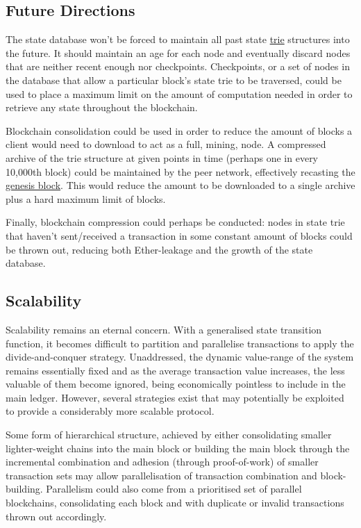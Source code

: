 \documentclass[9pt,oneside]{amsart}
\begin{document}
\begin{multicols}{2}
\section{Future Directions} \label{ch:future}

The state database won't be forced to maintain all past state \hyperlink{trie}{trie} structures into the future. It should maintain an age for each node and eventually discard nodes that are neither recent enough nor checkpoints. Checkpoints, or a set of nodes in the database that allow a particular block's state trie to be traversed, could be used to place a maximum limit on the amount of computation needed in order to retrieve any state throughout the blockchain.

Blockchain consolidation could be used in order to reduce the amount of blocks a client would need to download to act as a full, mining, node. A compressed archive of the trie structure at given points in time (perhaps one in every 10,000th block) could be maintained by the peer network, effectively recasting the \hyperlink{Genesis_Block}{genesis block}. This would reduce the amount to be downloaded to a single archive plus a hard maximum limit  of blocks.

Finally, blockchain compression could perhaps be conducted: nodes in state trie that haven't sent/received a transaction in some constant amount of blocks could be thrown out, reducing both Ether-leakage and the growth of the state database.

\subsection{Scalability}

Scalability remains an eternal concern. With a generalised state transition function, it becomes difficult to partition and parallelise transactions to apply the divide-and-conquer strategy. Unaddressed, the dynamic value-range of the system remains essentially fixed and as the average transaction value increases, the less valuable of them become ignored, being economically pointless to include in the main ledger. However, several strategies exist that may potentially be exploited to provide a considerably more scalable protocol.

Some form of hierarchical structure, achieved by either consolidating smaller lighter-weight chains into the main block or building the main block through the incremental combination and adhesion (through proof-of-work) of smaller transaction sets may allow parallelisation of transaction combination and block-building. Parallelism could also come from a prioritised set of parallel blockchains, consolidating each block and with duplicate or invalid transactions thrown out accordingly.


\end{multicols}
\end{document}
